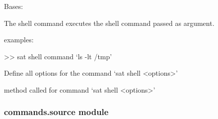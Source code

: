 \documentclass[a4paper,10pt,english]{sphinxmanual}
\begin{document}
\begin{fulllineitems}
\label{\detokenize{apidoc_commands/commands:commands.shell.Command}}
Bases: 

The shell command executes the shell command passed as argument.

\begin{DUlineblock}{0em}
\item[] examples:
\item[] \textgreater{}\textgreater{} sat shell \textendash{}command ‘ls -lt /tmp’
\end{DUlineblock}

\begin{fulllineitems}
\label{\detokenize{apidoc_commands/commands:commands.shell.Command.getParser}}
Define all options for the command ‘sat shell \textless{}options\textgreater{}’

\end{fulllineitems}


\begin{fulllineitems}
\label{\detokenize{apidoc_commands/commands:commands.shell.Command.name}}
\end{fulllineitems}


\begin{fulllineitems}
\label{\detokenize{apidoc_commands/commands:commands.shell.Command.run}}
method called for command ‘sat shell \textless{}options\textgreater{}’

\end{fulllineitems}


\end{fulllineitems}



\subsubsection{commands.source module}
\label{\detokenize{apidoc_commands/commands:module-commands.source}}\label{\detokenize{apidoc_commands/commands:commands-source-module}}
\end{document}
